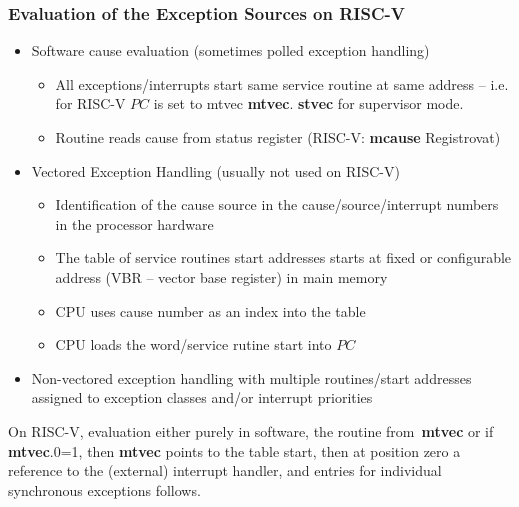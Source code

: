 \documentclass{beamer}
\begin{document}
\begin{frame}
\frametitle{Evaluation of the Exception Sources on RISC-V}

\begin{itemize}
 \item Software cause evaluation (sometimes polled exception handling)
 \begin{itemize}
  \item All exceptions/interrupts start same service routine at same
   address -- i.e. for RISC-V $PC$ is set to mtvec \textbf{mtvec}. \textbf{stvec}
   for supervisor mode.
  \item Routine reads cause from status register (RISC-V: \textbf{mcause} Registrovat)
 \end{itemize}
 \item Vectored Exception Handling (usually not used on RISC-V)
 \begin{itemize}
  \item Identification of the cause source in the cause/source/interrupt numbers
   in the processor hardware
  \item The table of service routines start addresses starts at fixed
   or configurable address (VBR -- vector base register) in main memory
  \item CPU uses cause number as an index into the table
  \item CPU loads the word/service rutine start into $PC$
 \end{itemize}
 \item Non-vectored exception handling with multiple routines/start
      addresses assigned to exception classes and/or interrupt priorities
\end{itemize}

\footnotesize

On RISC-V, evaluation either purely in software, the routine from~\textbf{mtvec} or if \textbf{mtvec}.0=1, then \textbf{mtvec} points to the table start, then at position zero a reference to the (external) interrupt handler, and entries for individual synchronous exceptions follows.
\end{frame}
\end{document}

